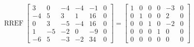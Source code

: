\begin{exerciseAnswer} 


\[\operatorname{RREF} \left[\begin{array}{ccccc|c}
3 & 0 & -4 & -4 & -1 & 0 \\
-4 & 5 & 3 & 1 & 16 & 0 \\
0 & 3 & -5 & -4 & 16 & 0 \\
1 & -5 & -2 & 0 & -9 & 0 \\
-6 & 5 & -3 & -2 & 34 & 0
\end{array}\right] = \left[\begin{array}{ccccc|c}
1 & 0 & 0 & 0 & -3 & 0 \\
0 & 1 & 0 & 0 & 2 & 0 \\
0 & 0 & 1 & 0 & -2 & 0 \\
0 & 0 & 0 & 1 & 0 & 0 \\
0 & 0 & 0 & 0 & 0 & 0
\end{array}\right] \]



\end{exerciseAnswer}
